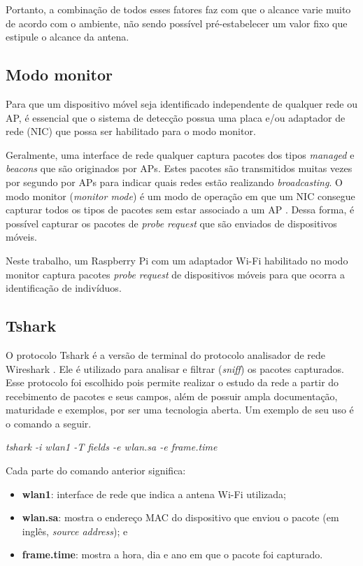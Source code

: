 Portanto, a combinação de todos esses fatores faz com que o alcance varie muito de acordo com o ambiente, não sendo possível pré-estabelecer um valor fixo que estipule o alcance da antena.

\subsection{Modo monitor}
\label{modo-monitor}
Para que um dispositivo móvel seja identificado independente de qualquer rede ou AP, é essencial que o sistema de detecção possua uma placa e/ou adaptador de rede (NIC) que possa ser habilitado para o modo monitor.

Geralmente, uma interface de rede qualquer captura pacotes dos tipos \emph{managed} e \emph{beacons} que são originados por APs. Estes pacotes são transmitidos
muitas vezes por segundo por APs para indicar quais redes estão realizando \emph{broadcasting}. O modo monitor (\emph{monitor mode}) é um modo de operação em que um NIC consegue capturar todos os tipos de pacotes sem estar associado a um AP \cite{Acrylic} \cite{Wireshark2017b}. Dessa forma, é possível capturar os pacotes de \emph{probe request} que são enviados de dispositivos móveis.

Neste trabalho, um Raspberry Pi com um adaptador Wi-Fi habilitado no modo monitor captura pacotes \emph{probe request} de dispositivos móveis
para que ocorra a identificação de indivíduos.

\subsection{Tshark}
\label{tshark-section}
O protocolo Tshark é a versão de terminal do protocolo
analisador de rede Wireshark \cite{Wireshark2017} \cite{Wireshark2017a}. Ele é
utilizado para analisar e filtrar (\emph{sniff}) os
pacotes capturados. Esse protocolo foi
escolhido pois permite realizar o estudo da rede a partir do recebimento de
pacotes e seus campos, além de possuir ampla documentação, maturidade e exemplos, por ser uma tecnologia aberta. Um exemplo de seu uso é o comando a seguir.

\begin{center}
\emph{tshark -i wlan1 -T fields -e wlan.sa -e frame.time}
\end{center}

Cada parte do comando anterior significa:
\begin{itemize}
  \item \textbf{wlan1}: interface de rede que indica a antena Wi-Fi utilizada;
  \item \textbf{wlan.sa}: mostra o endereço MAC do dispositivo que enviou o pacote (em inglês, \emph{source address}); e
  \item \textbf{frame.time}: mostra a hora, dia e ano em que o pacote foi capturado.
\end{itemize}

